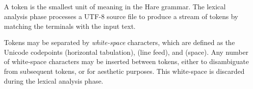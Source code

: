 
\begin{grammar}
\\
	 \\
	 \\
	 \\
	 \\

\oneof \\
	\terminal{!}
	\terminal{!=}
	\terminal{\%}
	\terminal{\%=}
	\terminal{\&}
	\terminal{\&\&}
	\terminal{\&\&=}
	\terminal{\&=}
	\terminal{(}
	\terminal{)}
	\terminal{*}
	\terminal{*=}
	\terminal{+}
	\terminal{+=}
	\terminal{,}
	\terminal{-}
	\terminal{-=}
	\terminal{/}
	\terminal{/=}
	\terminal{:}
	\terminal{::}
	\terminal{;}
	\terminal{<}
	\terminal{\textless{}\textless{}}
	\terminal{\textless{}\textless{}=}
	\terminal{<=}
	\terminal{=}
	\terminal{==}
	\terminal{=>}
	\terminal{>}
	\terminal{>=}
	\terminal{\textgreater{}\textgreater{}}
	\terminal{\textgreater{}\textgreater{}=}
	\terminal{[}
	\terminal{]}
	\terminal{\textasciicircum}
	\terminal{\textasciicircum=}
	\terminal{\textasciicircum\textasciicircum}
	\terminal{\textasciicircum\textasciicircum=}
	\terminal{\{}
	\terminal{|}
	\terminal{|=}
	\terminal{||}
	\terminal{||=}
	\terminal{\}}
	\terminal{\textasciitilde}

\exactly\\
	\terminal{//}  

\exactly\\
	 

\\

\end{grammar}

\specsubitem
A token is the smallest unit of meaning in the Hare grammar. The lexical
analysis phase processes a \hbox{UTF-8} source file to produce a stream of
tokens by matching the terminals with the input text.

\specsubitem
Tokens may be separated by \textit{white-space} characters, which are defined as
the Unicode codepoints  (horizontal tabulation), 
(line feed), and  (space). Any number of white-space characters may
be inserted between tokens, either to disambiguate from subsequent tokens, or
for aesthetic purposes. This white-space is discarded during the lexical
analysis phase.

